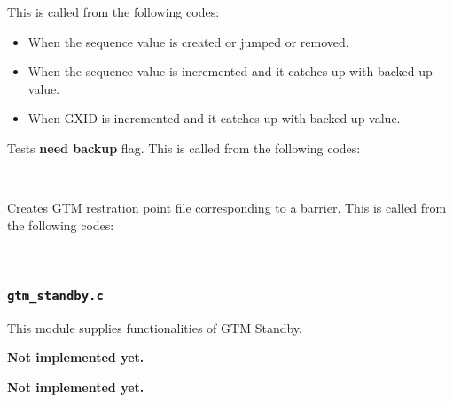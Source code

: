     This is called from the following codes:
    
    \begin{itemize}
      \item When the sequence value is created or jumped or removed.
      \item When the sequence value is incremented and it catches up with backed-up value.
      \item When GXID is incremented and it catches up with backed-up value.
    \end{itemize}
  
  
    Tests \textbf{need backup} flag.
    This is called from the following codes:
    
    \FuncRefHdr
		\\ \hline
    \FuncRefTrailor
  
  
    Creates GTM restration point file corresponding to a barrier.
    This is called from the following codes:
    
    \FuncRefHdr
		\\ \hline
    \FuncRefTrailor




\subsubsection{\texttt{gtm\_standby.c}}

  This module supplies functionalities of GTM Standby.
  
  
    \textbf{Not implemented yet.}
  
  
    \textbf{Not implemented yet.}
  
  

